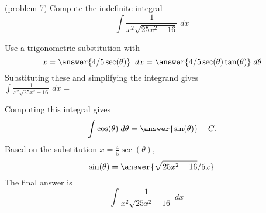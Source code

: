 \documentclass{ximera}
\begin{document}
\begin{problem}(problem 7)
Compute the indefinite integral
\[
\int \frac{1}{x^2\sqrt{25x^2-16}} \; dx
\]


Use a trigonometric substitution with\\
\[
x = \answer{4/5 \sec(\theta)} \;\; dx = \answer{4/5 \sec(\theta)\tan(\theta)} \; d\theta
\]
Substituting these and simplifying the integrand gives\\
$\displaystyle{\int  \frac{1}{x^2 \sqrt{ 25x^2 -16}}\; dx =}$\\
\begin{multipleChoice}
\end{multipleChoice}

Computing this integral gives
\[
\int \cos(\theta) \; d\theta = \answer{\sin(\theta) } + C.
\]
Based on the substitution $x = \frac45\sec(\theta)$, \\
\[
\sin(\theta) = \answer{\sqrt{25x^2 -16}/5x}
\]
The final answer is
\[
\int   \frac{1}{x^2\sqrt{25x^2-16}} \; dx = 
\]

\begin{center}
\begin{multipleChoice}
\end{multipleChoice}
\end{center}


\end{problem}
\end{document}
